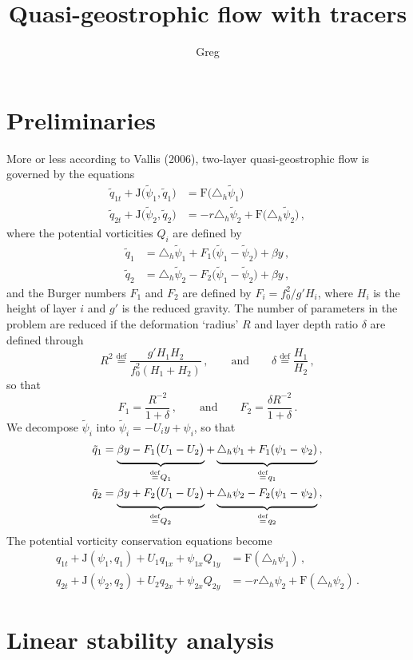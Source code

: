 \documentclass[12pt, oneside]{article}
\newcommand*\mystrut[1]{\vrule width0pt height0pt depth#1\relax}
\newcommand{\com}{\, ,}
\newcommand{\per}{\, .}
\newcommand{\defn}{\ensuremath{\stackrel{\mathrm{def}}{=}}}
\newcommand{\beq}{\begin{equation}}
\newcommand{\eeq}{\end{equation}}
\newcommand{\hlap}{\triangle_h}
\newcommand{\J}{\mathrm{J}}
\newcommand{\friction}{\mathrm{F}}
\newcommand{\q}{\tilde q}
\newcommand{\qpsi}{\tilde \psi}
\begin{document}
\title{\vspace{-4ex} Quasi-geostrophic flow with tracers}
\author{Greg}
\date{} \maketitle \vspace{-4ex}

\section{Preliminaries}

More or less according to Vallis (2006), two-layer quasi-geostrophic flow is governed by the equations
\begin{align}
\q_{1t} + \J \big ( \qpsi_1, \q_1 \big ) &= \friction \big ( \hlap \qpsi_1 \big ) \\
\q_{2t} + \J \big ( \qpsi_2, \q_2 \big ) &= -r \hlap \qpsi_2 + \friction  \big( \hlap \qpsi_2 \big ) \com 
\end{align}
where the potential vorticities $Q_i$ are defined by
\begin{align}
\q_{1} &= \hlap \qpsi_1 + F_1 \big ( \qpsi_1 - \qpsi_2 \big ) + \beta y \com \\
\q_2 &= \hlap \qpsi_2 - F_2 \big ( \qpsi_1 - \qpsi_2 \big ) + \beta y \com
\end{align}
and the Burger numbers $F_1$ and $F_2$ are defined by $F_i = f_0^2 / g' H_i$, where $H_i$ is the height of layer $i$ and $g'$ is the reduced gravity. The number of parameters in the problem are reduced if the deformation `radius' $R$ and layer depth ratio $\delta$ are defined through
\beq  
R^2 \defn \frac{g' H_1 H_2}{f_0^2 \left ( H_1 + H_2 \right )} \com \qquad \text{and} \qquad \delta \defn \frac{H_1}{H_2} \com
\eeq
so that 
\beq
F_1 = \frac{R^{-2}}{1 + \delta} \com \qquad \text{and} \qquad F_2 = \frac{\delta R^{-2}}{1 + \delta} \per
\eeq
We decompose $\qpsi_i$ into $\qpsi_i = - U_i y + \psi_i$, so that
\begin{align}
\q_1 &= \underbrace{\mystrut{1.4ex}  \beta y - F_1 \big ( U_1 - U_2 \big )}_{\defn Q_1} + \underbrace{\mystrut{1.4ex} \hlap \psi_1 + F_1 ( \psi_1 - \psi_2 )}_{\defn q_1} \com \\
\q_2 &= \underbrace{\mystrut{1.4ex}  \beta y + F_2 \big ( U_1 - U_2 \big )}_{\defn Q_2} + \underbrace{\mystrut{1.4ex} \hlap \psi_2 - F_2 ( \psi_1 - \psi_2 )}_{\defn q_2} \com
\end{align}
The potential vorticity conservation equations become
\begin{align}
q_{1t} + \J \left( \psi_1, q_1 \right ) + U_1 q_{1x} + \psi_{1x} Q_{1y} &= \friction \left ( \hlap \psi_1 \right) \com \\
 q_{2t} + \J \left( \psi_2, q_2 \right ) + U_2 q_{2x} + \psi_{2x} Q_{2y} &= - r \hlap \psi_2 + \friction \left ( \hlap \psi_2 \right) \per
\end{align}

\section{Linear stability analysis}



\end{document}
